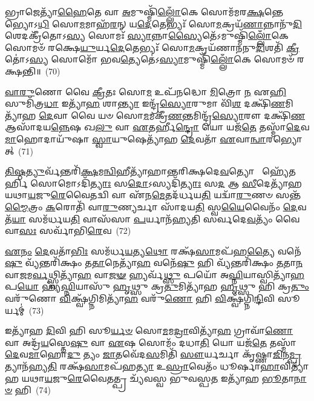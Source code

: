 𑌭𑍍𑌰𑌾𑌜𑍇𑌤𑍍𑌯𑌾᳴\-\ul{𑌹𑍈}\-𑌤𑍇 𑌵𑌾 \ul{𑌅}\-𑌮𑍁𑌷𑍍𑌮𑌿᳴\-\ul{𑌲𑍍𑌲𑍋𑌁}\-𑌕𑍇 𑌸𑍋𑌮᳴𑌮𑌰\-\ul{𑌕𑍍𑌷}\-𑌨𑍍𑌤𑍇𑌭𑍍𑌯𑍋\-𑌽\-\ul{𑌧𑌿} 𑌸𑍋\-\ul{𑌮}\-𑌮𑌾𑌹᳴\-\ul{𑌰}\-𑌨𑍍 𑌯\-\ul{𑌦𑍇}\-𑌤𑍇𑌭𑍍𑌯𑌃᳴ 𑌸𑍋\-\ul{𑌮}\-𑌕𑍍𑌰𑌯᳴\-\ul{𑌣𑌾}\-𑌨𑍍𑌨𑌾𑌨𑍁᳴\-\ul{𑌦𑌿}\-𑌶𑍇𑌦𑌕𑍍𑌰𑍀᳴𑌤𑍋\-𑌽\-\ul{𑌸𑍍𑌯} 𑌸𑍋𑌮𑌃᳴ \ul{𑌸𑍍𑌯𑌾}\-𑌨𑍍𑌨𑌾\-\ul{𑌸𑍍𑌯𑍈}\-𑌤𑍇᳴\-𑌽𑌮𑍁𑌷𑍍𑌮𑌿᳴\-\ul{𑌲𑍍𑌲𑍋𑌁}\-𑌕𑍇 𑌸𑍋𑌮𑍞᳴ 𑌰𑌕𑍍𑌷𑍇\-\ul{𑌯𑍁}\-𑌰𑍍𑌯\-\ul{𑌦𑍇}\-𑌤𑍇𑌭𑍍𑌯𑌃᳴ 𑌸𑍋\-\ul{𑌮}\-𑌕𑍍𑌰𑌯᳴𑌣𑌾𑌨𑌨𑍁\-\ul{𑌦𑌿}\-𑌶𑌤𑌿᳴ \ul{𑌕𑍍𑌰𑍀}\-𑌤𑍋॑\-𑌽\-\ul{𑌸𑍍𑌯} 𑌸𑍋𑌮𑍋᳴ 𑌭𑌵\-\ul{𑌤𑍍𑌯𑍇}\-𑌤𑍇॑\-𑌽\-\ul{𑌸𑍍𑌯𑌾}\-𑌮𑍁𑌷𑍍𑌮𑌿᳴\-\ul{𑌲𑍍𑌲𑍋𑌁}\-𑌕𑍇 𑌸𑍋𑌮𑍞᳴ 𑌰𑌕𑍍𑌷𑌨𑍍𑌤𑌿॥~(70)

{\anuvakamend[{𑌸𑌶𑍁᳴𑌕𑍍𑌰\-\ul{𑌮𑍇}\-𑌵 𑌰𑍁᳴\-\ul{𑌨𑍍𑌧} 𑌇\-\ul{𑌤𑌿} 𑌯𑍇\-\ul{𑌨} 𑌹𑌿𑌰᳴𑌣𑍍𑌯𑍇\-\ul{𑌨} 𑌸𑍍𑌵𑌾\-\ul{𑌨} 𑌚𑌤𑍁᳴𑌶𑍍𑌚𑌤𑍍𑌵𑌾𑌰𑌿𑍞𑌶𑌚𑍍𑌚}]}%

\-\ul{𑌵𑌾}\-\-\ul{𑌰𑍁}\-𑌣𑍋 𑌵𑍈 \ul{𑌕𑍍𑌰𑍀}\-𑌤𑌃 𑌸𑍋\-\ul{𑌮} 𑌉𑌪᳴𑌨𑌦𑍍𑌧𑍋 \ul{𑌮𑌿}\-𑌤𑍍𑌰𑍋 \ul{𑌨} 𑌏\-\ul{𑌹𑌿} 𑌸𑍁𑌮𑌿᳴𑌤𑍍𑌰\-\ul{𑌧𑌾} 𑌇𑌤𑍍𑌯𑌾᳴\-\ul{𑌹} 𑌶𑌾\-\ul{𑌨𑍍𑌤𑍍𑌯𑌾} 𑌇𑌨𑍍𑌦𑍍𑌰᳴\-\ul{𑌸𑍍𑌯𑍋}\-𑌰𑍁𑌮𑌾 𑌵𑌿᳴\-\ul{𑌶} 𑌦𑌕𑍍𑌷𑌿᳴\-\ul{𑌣}\-𑌮𑌿𑌤𑍍𑌯𑌾᳴𑌹 \ul{𑌦𑍇}\-𑌵𑌾 𑌵𑍈 𑌯𑍞 𑌸𑍋\-\ul{𑌮}\-𑌮𑌕𑍍𑌰𑍀᳴\-\ul{𑌣}\-𑌨𑍍𑌤𑌮𑌿𑌨𑍍𑌦𑍍𑌰᳴\-\ul{𑌸𑍍𑌯𑍋}\-𑌰𑍗 𑌦𑌕𑍍𑌷𑌿᳴\-\ul{𑌣} 𑌆𑌸𑌾᳴𑌦𑌯\-\ul{𑌨𑍍𑌨𑍇}\-𑌷 𑌖\-\ul{𑌲𑍁} 𑌵𑌾 \ul{𑌏}\-𑌤𑌰𑍍\mbox{}𑌹𑍀\-\ul{𑌨𑍍𑌦𑍍𑌰𑍋} 𑌯𑍋 𑌯𑌜᳴\-\ul{𑌤𑍇} 𑌤𑌸𑍍𑌮𑌾᳴\-\ul{𑌦𑍇}\-𑌵\-\ul{𑌮𑌾}\-𑌹𑍋𑌦𑌾𑌯𑍁᳴𑌷𑌾 \ul{𑌸𑍍𑌵𑌾}\-𑌯𑍁𑌷𑍇𑌤𑍍𑌯𑌾᳴𑌹 \ul{𑌦𑍇}\-𑌵𑌤𑌾᳴ \ul{𑌏}\-𑌵𑌾\-\ul{𑌨𑍍𑌵𑌾}\-𑌰𑌭𑍍𑌯𑍋𑌤𑍍~(71)

\-\ul{𑌤𑌿}\-\-\ul{𑌷𑍍𑌠}\-\-\ul{𑌤𑍍𑌯𑍁}\-𑌰𑍍𑌵᳴𑌨𑍍𑌤𑌰𑌿᳴\-\ul{𑌕𑍍𑌷}\-𑌮\-\ul{𑌨𑍍𑌵𑌿}\-𑌹𑍀𑌤𑍍𑌯𑌾᳴𑌹𑌾𑌨𑍍𑌤𑌰𑌿𑌕𑍍𑌷𑌦𑍇\-\ul{𑌵}\-𑌤𑍍𑌯𑍋  𑌹𑍍𑌯𑍇᳴𑌤𑌰𑍍\mbox{}\-\ul{𑌹𑌿} 𑌸𑍋𑌮𑍋\-𑌽𑌦𑌿᳴\-\ul{𑌤𑍍𑌯𑌾𑌃} 𑌸\-\ul{𑌦𑍋}\-\-𑌽𑌸𑍍𑌯𑌦𑌿᳴\-\ul{𑌤𑍍𑌯𑌾𑌃} 𑌸\-\ul{𑌦} 𑌆 \ul{𑌸𑍀}\-𑌦𑍇𑌤𑍍𑌯𑌾᳴𑌹 𑌯𑌥𑌾\-\ul{𑌯}\-𑌜𑍁\-\ul{𑌰𑍇}\-𑌵𑍈𑌤𑌦𑍍𑌵𑌿 𑌵𑌾 𑌏᳴𑌨\-\ul{𑌮𑍇}\-𑌤𑌦᳴𑌰𑍍𑌧𑌯\-\ul{𑌤𑌿} 𑌯𑌦𑍍𑌵𑌾᳴\-\ul{𑌰𑍁}\-𑌣𑍞 𑌸𑌨𑍍𑌤᳴\-\ul{𑌮𑍍𑌮𑍈}\-𑌤𑍍𑌰𑌂 \ul{𑌕}\-𑌰𑍋𑌤𑌿᳴ 𑌵𑌾\-\ul{𑌰𑍁}\-𑌣𑍍𑌯𑌰𑍍𑌚𑌾 𑌸𑌾᳴𑌦𑌯\-\ul{𑌤𑌿} 𑌸𑍍𑌵\-\ul{𑌯𑍈}\-𑌵𑍈𑌨𑌂᳴ \ul{𑌦𑍇}\-𑌵𑌤᳴\-\ul{𑌯𑌾} 𑌸𑌮᳴𑌰𑍍𑌧𑌯\-\ul{𑌤𑌿} 𑌵𑌾𑌸᳴𑌸𑌾 \ul{𑌪}\-𑌰𑍍𑌯𑌾𑌨᳴𑌹𑍍𑌯𑌤𑌿 𑌸𑌰𑍍𑌵𑌦𑍇\-\ul{𑌵}\-𑌤𑍍𑌯𑌂᳴ 𑌵𑍈 𑌵𑌾\-\ul{𑌸𑌃} 𑌸𑌰𑍍𑌵𑌾᳴𑌭𑌿\-\ul{𑌰𑍇}\-𑌵~(72)

\-\ul{𑌏}\-\-\ul{𑌨𑌂} \ul{𑌦𑍇}\-𑌵𑌤𑌾᳴\-\ul{𑌭𑌿𑌃} 𑌸𑌮᳴𑌰𑍍𑌧\-\ul{𑌯}\-𑌤𑍍𑌯\-\ul{𑌥𑍋} 𑌰𑌕𑍍𑌷᳴\-\ul{𑌸𑌾}\-𑌮𑌪᳴𑌹\-\ul{𑌤𑍍𑌯𑍈} 𑌵𑌨𑍇᳴\-\ul{𑌷𑍁} 𑌵𑍍𑌯᳴𑌨𑍍𑌤𑌰𑌿᳴𑌕𑍍𑌷𑌂 𑌤\-\ul{𑌤𑌾}\-𑌨𑍇𑌤𑍍𑌯𑌾᳴\-\ul{𑌹} 𑌵𑌨𑍇᳴\-\ul{𑌷𑍁} 𑌹𑌿 𑌵𑍍𑌯᳴𑌨𑍍𑌤𑌰𑌿᳴𑌕𑍍𑌷𑌂 \ul{𑌤}\-𑌤𑌾\-\ul{𑌨} 𑌵𑌾\-\ul{𑌜}\-𑌮\-\ul{𑌰𑍍𑌵}\-𑌥𑍍𑌸𑍍𑌵𑌿𑌤𑍍𑌯𑌾᳴\-\ul{𑌹} 𑌵𑌾\-\ul{𑌜}\-\-\ul{𑍟} 𑌹𑍍𑌯𑌰𑍍𑌵᳴\-\ul{𑌥𑍍𑌸𑍁} 𑌪𑌯𑍋᳴ 𑌅\-\ul{𑌘𑍍𑌨𑌿}\-𑌯𑌾𑌸𑍍𑌵𑌿𑌤𑍍𑌯𑌾᳴\-\ul{𑌹} 𑌪\-\ul{𑌯𑍋} 𑌹𑍍𑌯᳴\-\ul{𑌘𑍍𑌨𑌿}\-𑌯𑌾𑌸𑍁᳴ \ul{𑌹𑍃}\-𑌥𑍍𑌸𑍁 𑌕𑍍𑌰\-\ul{𑌤𑍁}\-𑌮𑌿𑌤𑍍𑌯𑌾᳴𑌹 \ul{𑌹𑍃}\-𑌥𑍍𑌸𑍁 𑌹𑌿 𑌕𑍍𑌰\-\ul{𑌤𑍁𑌂} 𑌵𑌰𑍁᳴𑌣𑍋 \ul{𑌵𑌿}\-𑌕𑍍𑌷𑍍𑌵᳴𑌗𑍍𑌨𑌿𑌮𑌿𑌤𑍍𑌯𑌾᳴\-\ul{𑌹} 𑌵𑌰𑍁᳴\-\ul{𑌣𑍋} 𑌹𑌿 \ul{𑌵𑌿}\-𑌕𑍍𑌷𑍍𑌵᳴𑌗𑍍𑌨𑌿\-\ul{𑌨𑍍𑌦𑌿}\-𑌵𑌿 𑌸𑍂𑌰𑍍𑌯𑌮𑍍॑~(73)

𑌇𑌤𑍍𑌯𑌾᳴𑌹 \ul{𑌦𑌿}\-𑌵𑌿 𑌹𑌿 𑌸𑍂\-\ul{𑌰𑍍𑌯}\-\-\ul{𑍞} 𑌸𑍋\-\ul{𑌮}\-𑌮\-\ul{𑌦𑍍𑌰𑌾}\-𑌵𑌿𑌤𑍍𑌯𑌾᳴\-\ul{𑌹} 𑌗𑍍𑌰𑌾𑌵𑌾᳴\-\ul{𑌣𑍋} 𑌵𑌾 𑌅𑌦𑍍𑌰᳴\-\ul{𑌯}\-𑌸𑍍𑌤𑍇\-\ul{𑌷𑍁} 𑌵𑌾 \ul{𑌏}\-𑌷 𑌸𑍋𑌮𑌂᳴ 𑌦𑌧𑌾\-\ul{𑌤𑌿} 𑌯𑍋 𑌯𑌜᳴\-\ul{𑌤𑍇} 𑌤𑌸𑍍𑌮𑌾᳴\-\ul{𑌦𑍇}\-𑌵\-\ul{𑌮𑌾}\-𑌹𑍋\-\ul{𑌦𑍁} 𑌤𑍍𑌯𑌂 \ul{𑌜𑌾}\-𑌤𑌵𑍇᳴𑌦\-\ul{𑌸}\-𑌮𑌿𑌤𑌿᳴ \ul{𑌸𑍗}\-𑌰𑍍𑌯𑌰𑍍𑌚𑌾 𑌕𑍃᳴𑌷𑍍𑌣𑌾\-\ul{𑌜𑌿}\-𑌨\-\ul{𑌮𑍍𑌪𑍍𑌰}\-𑌤𑍍𑌯𑌾𑌨᳴𑌹𑍍𑌯\-\ul{𑌤𑌿} 𑌰𑌕𑍍𑌷᳴\-\ul{𑌸𑌾}\-𑌮𑌪᳴𑌹\-\ul{𑌤𑍍𑌯𑌾} 𑌉\-\ul{𑌸𑍍𑌰𑌾}\-𑌵𑍇𑌤𑌂᳴ 𑌧𑍂𑌰𑍍\mbox{}𑌷𑌾\-\ul{𑌹𑌾}\-𑌵𑌿𑌤𑍍𑌯𑌾᳴𑌹 𑌯𑌥𑌾\-\ul{𑌯}\-𑌜𑍁\-\ul{𑌰𑍇}\-𑌵𑍈𑌤𑌤𑍍𑌪𑍍𑌰 𑌚𑍍𑌯᳴𑌵𑌸𑍍𑌵 𑌭𑍁𑌵𑌸𑍍𑌪\-\ul{𑌤} 𑌇𑌤𑍍𑌯𑌾᳴𑌹 \ul{𑌭𑍂}\-𑌤𑌾\-\ul{𑌨𑌾}\-\-\ul{𑍞} 𑌹𑌿~(74)

